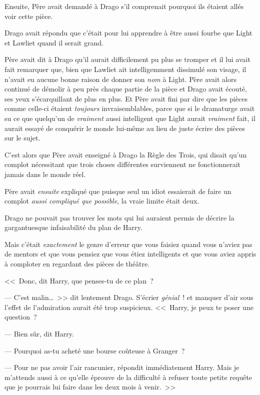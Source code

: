 Ensuite, Père avait demandé à Drago s'il comprenait pourquoi ils étaient allés voir cette pièce.

Drago avait répondu que c'était pour lui apprendre à être aussi fourbe que Light et Lawliet quand il serait grand.

Père avait dit à Drago qu'il aurait difficilement pu plus se tromper et il lui avait fait remarquer que, bien que Lawliet ait intelligemment dissimulé son visage, il n'avait eu aucune bonne raison de donner son \emph{nom} à Light. Père avait alors continué de démolir à peu près chaque partie de la pièce et Drago avait écouté, ses yeux s'écarquillant de plus en plus. Et Père avait fini par dire que les pièces comme celle-ci étaient \emph{toujours} invraisemblables, parce que si le dramaturge avait su ce que quelqu'un de \emph{vraiment} aussi intelligent que Light aurait \emph{vraiment} fait, il aurait essayé de conquérir le monde lui-même au lieu de juste écrire des pièces sur le sujet.

C'est alors que Père avait enseigné à Drago la Règle des Trois, qui disait qu'un complot nécessitant que trois choses différentes surviennent ne fonctionnerait jamais dans le monde réel.

Père avait \emph{ensuite} expliqué que puisque seul un idiot essaierait de faire un complot \emph{aussi compliqué que possible}, la vraie limite était deux.

Drago ne pouvait pas trouver les mots qui lui auraient permis de décrire la gargantuesque infaisabilité du plan de Harry.

Mais c'était \emph{exactement} le genre d'erreur que vous faisiez quand vous n'aviez pas de mentors et que vous pensiez que vous étiez intelligents et que vous aviez appris à comploter en regardant des pièces de théâtre.

<<~Donc, dit Harry, que penses-tu de ce plan~?

--- C'est malin…~>> dit lentement Drago. S'écrier \emph{génial}~! et manquer d'air sous l'effet de l'admiration aurait été trop suspicieux. <<~Harry, je peux te poser une question~?

--- Bien sûr, dit Harry.

--- Pourquoi as-tu acheté une bourse coûteuse à Granger~?

--- Pour ne pas avoir l'air rancunier, répondit immédiatement Harry. Mais je m'attends aussi à ce qu'elle éprouve de la difficulté à refuser toute petite requête que je pourrais lui faire dans les deux mois à venir.~>>

